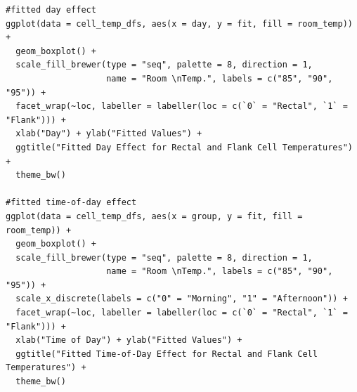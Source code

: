 \documentclass[a4paper, 10pt, titlepage]{article}
\begin{document}
\begin{lstlisting}[basicstyle = \footnotesize \ttfamily]
#fitted day effect
ggplot(data = cell_temp_dfs, aes(x = day, y = fit, fill = room_temp)) +
  geom_boxplot() +
  scale_fill_brewer(type = "seq", palette = 8, direction = 1,
                    name = "Room \nTemp.", labels = c("85", "90", "95")) + 
  facet_wrap(~loc, labeller = labeller(loc = c(`0` = "Rectal", `1` = "Flank"))) +
  xlab("Day") + ylab("Fitted Values") +
  ggtitle("Fitted Day Effect for Rectal and Flank Cell Temperatures") +
  theme_bw()

#fitted time-of-day effect
ggplot(data = cell_temp_dfs, aes(x = group, y = fit, fill = room_temp)) +
  geom_boxplot() +
  scale_fill_brewer(type = "seq", palette = 8, direction = 1,
                    name = "Room \nTemp.", labels = c("85", "90", "95")) + 
  scale_x_discrete(labels = c("0" = "Morning", "1" = "Afternoon")) + 
  facet_wrap(~loc, labeller = labeller(loc = c(`0` = "Rectal", `1` = "Flank"))) +
  xlab("Time of Day") + ylab("Fitted Values") +
  ggtitle("Fitted Time-of-Day Effect for Rectal and Flank Cell Temperatures") +
  theme_bw()

\end{lstlisting}
\end{document}
